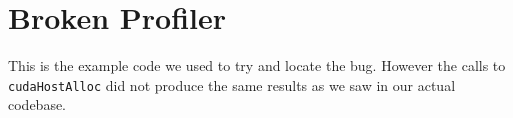\section{Broken Profiler}
This is the example code we used to try and locate the bug. However the calls to
\verb!cudaHostAlloc! did not produce the same results as we saw in our actual codebase.
